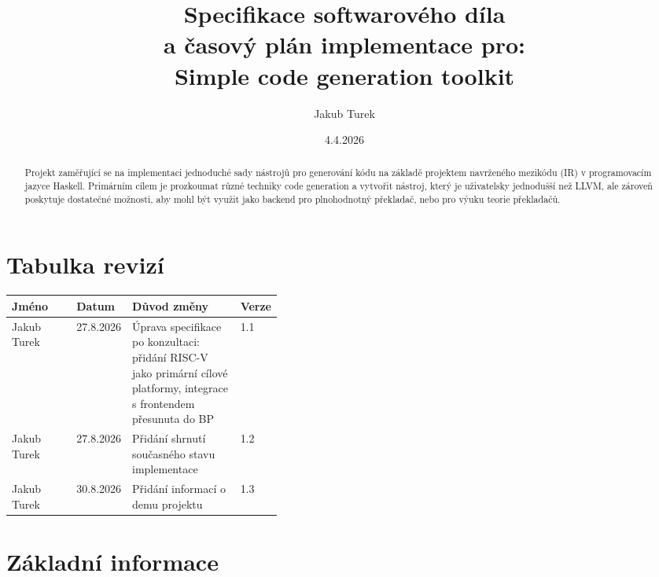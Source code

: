 \documentclass{article}
\title{Specifikace softwarového díla\\a časový plán implementace pro: \\ \textbf{Simple code generation toolkit }}
\author{Jakub Turek}
\date{4.4.2026}
\def\xxx#1{\textcolor{red!50}{\itshape #1}}
\begin{document}
\maketitle

\begin{abstract}
Projekt zaměřující se na implementaci jednoduché sady nástrojů pro generování kódu na základě projektem navrženého mezikódu (IR) v programovacím jazyce Haskell. Primárním cílem je prozkoumat různé techniky code generation a vytvořit nástroj, který je uživatelsky jednodušší než LLVM, ale zároveň poskytuje dostatečné možnosti, aby mohl být využit jako backend pro plnohodnotný překladač, nebo pro výuku teorie překladačů.
\end{abstract}

\clearpage
\tableofcontents

\clearpage
\section*{Tabulka revizí}

\begin{center}
\begin{tabular}{llp{0.4\linewidth}l}
\toprule
Jméno & Datum & Důvod změny & Verze \\
\midrule
Jakub Turek & 27.8.2026 & Úprava specifikace po konzultaci: přidání RISC-V jako primární cílové platformy, integrace s frontendem přesunuta do BP & 1.1 \\
\midrule
Jakub Turek & 27.8.2026 & Přidání shrnutí současného stavu implementace & 1.2 \\
\midrule
Jakub Turek & 30.8.2026 & Přidání informací o demu projektu & 1.3 \\
\bottomrule
\end{tabular}
\end{center}

\clearpage
\section{Základní informace}

\end{document}

